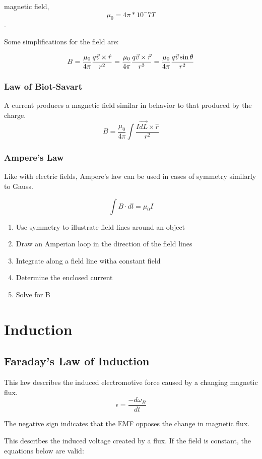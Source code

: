 \documentclass{article}
\begin{document}
magnetic field, $$\mu_0=4\pi * 10^-7 T$$.

Some simplifications for the field are:

 $$B=\frac{\mu_0}{4\pi} \frac{q\vec{v}\times \hat{r}}{r^2}=\\
 \frac{\mu_0}{4\pi} \frac{q\vec{v}\times \vec{r}}{r^3}=\\
 \frac{\mu_0}{4\pi} \frac{q\vec{v}\sin{\theta}}{r^2}$$

 \subsubsection{Law of Biot-Savart}
 A current produces a magnetic field similar in behavior to that produced by
 the charge.
 $$B=\frac{\mu_0}{4\pi} \int{\frac{I \vec{dL}\times\hat{r}}{r^2}}$$

 \subsubsection{Ampere's Law}
 Like with electric fields, Ampere's law can be used in cases of symmetry similarly to Gauss.

 $$\int{B\cdot dl}=\mu_0 I$$

 \begin{enumerate}
	\item Use symmetry to illustrate field lines around an object
	\item Draw an Amperian loop in the direction of the field lines
	\item Integrate along a field line witha constant field
	\item Determine the enclosed current
	\item Solve for B
 \end{enumerate}


\section{Induction}

\subsection{Faraday's Law of Induction}
This law describes the induced electromotive force caused by a changing magnetic flux.
$$\epsilon=\frac{-d\omega_B}{dt}$$

The negative sign indicates that the EMF opposes the change in magnetic flux.

This describes the induced voltage created by a flux. If the field is constant, the equations below are valid:
\end{document}
